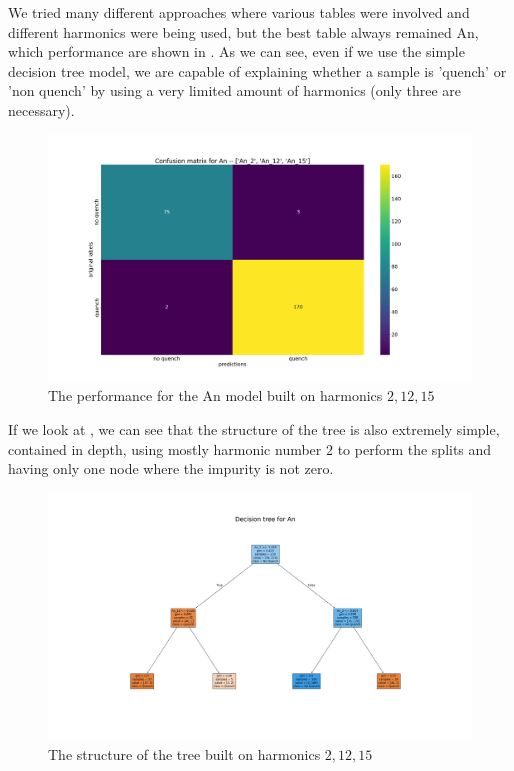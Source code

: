 We tried many different approaches where various tables were involved and different harmonics were
being used, but the best table always remained An, which performance are shown in
. As we can see, even if we use the simple decision tree model, we are
capable of explaining whether a sample is 'quench' or 'non quench' by using a very limited amount of
harmonics (only three are necessary).
\begin{figure}
	\centering
	\includegraphics[scale=.2]{img/An_2_12_15_cm_dt.png}
	\caption{The performance for the An model built on harmonics $2, 12, 15$} \label{fig:dt-an-2-12-15-perf}
\end{figure}
If we look at , we can see that the structure of the tree is also
extremely simple, contained in depth, using mostly harmonic number $2$ to perform the splits and
having only one node where the impurity is not zero.
\begin{figure}
	\centering
	\includegraphics[scale=.15]{img/An_2_12_15_pt_dt.png}
	\caption{The structure of the tree built on harmonics $2, 12, 15$} \label{fig:dt-an-2-12-15-pt}
\end{figure}



